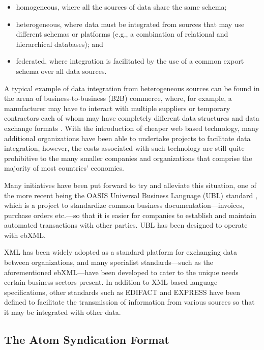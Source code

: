 \documentclass{CRPITStyle}
\begin{document}
\begin{itemize}

	\item homogeneous, where all the sources of data share the same
	schema;

	\item heterogeneous, where data must be integrated from sources that
	may use different schemas or platforms (e.g., a combination of
	relational and hierarchical databases); and

	\item federated, where integration is facilitated by the use of a
	common export schema over all data sources.

\end{itemize}

A typical example of data integration from heterogeneous sources can be
found in the arena of business-to-business (B2B) commerce, where, for
example, a manufacturer may have to interact with multiple suppliers or
temporary contractors each of whom may have completely different data
structures and data exchange formats \cite{Ston-M-2001-SIGMOD}. With the
introduction of cheaper web based technology, many additional
organizations have been able to undertake projects to facilitate data
integration, however, the costs associated with such technology are
still quite prohibitive to the many smaller companies and organizations
that comprise the majority of most countries' economies.

Many initiatives have been put forward to try and alleviate this
situation, one of the more recent being the OASIS Universal Business
Language (UBL) standard \cite{Mead-B-2004-UBL}, which is a project to
standardize common business documentation---invoices, purchase orders
etc.---so that it is easier for companies to establish and maintain
automated transactions with other parties. UBL has been designed to
operate with ebXML.

XML has been widely adopted as a standard platform for exchanging data
between organizations, and many specialist standards---such as the
aforementioned ebXML---have been developed to cater to the unique needs
certain business sectors present. In addition to XML-based language
specifications, other standards such as EDIFACT  and EXPRESS have been
defined to facilitate the transmission of information from various
sources so that it may be integrated with other data.


\subsection{The Atom Syndication Format}
\label{sec-atom-overview}
\end{document}
